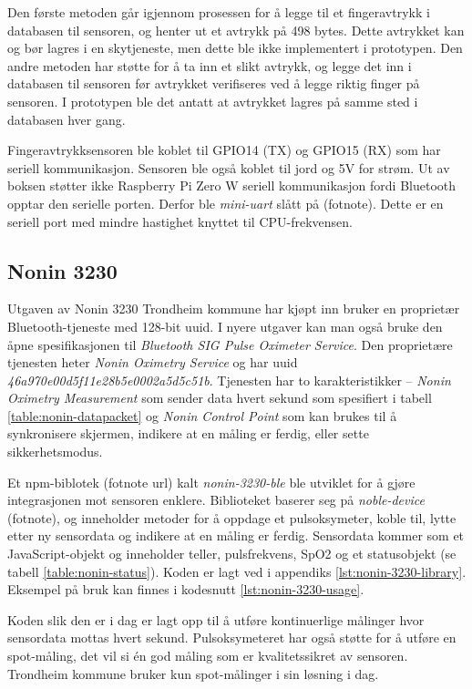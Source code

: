 Den første metoden går igjennom prosessen for å legge til et fingeravtrykk i databasen til sensoren, og henter ut et avtrykk
på 498 bytes. Dette avtrykket kan og bør lagres i en skytjeneste, men dette ble ikke implementert i prototypen.
Den andre metoden har støtte for å ta inn et slikt avtrykk, og legge det inn i databasen til sensoren før avtrykket
verifiseres ved å legge riktig finger på sensoren. I prototypen ble det antatt at avtrykket lagres på samme sted i databasen hver gang.

Fingeravtrykksensoren ble koblet til GPIO14 (TX) og GPIO15 (RX) som har seriell kommunikasjon. Sensoren ble også koblet til jord
og 5V for strøm. Ut av boksen støtter ikke Raspberry Pi Zero W seriell kommunikasjon fordi Bluetooth opptar den serielle porten.
Derfor ble \textit{mini-uart} slått på (fotnote). Dette er en seriell port med mindre hastighet knyttet til CPU-frekvensen.

\subsection{Nonin 3230}
Utgaven av Nonin 3230 Trondheim kommune har kjøpt inn bruker en proprietær Bluetooth-tjeneste med 128-bit \gls{uuid}.
I nyere utgaver kan man også bruke den åpne spesifikasjonen til \textit{Bluetooth SIG Pulse Oximeter Service}.
Den proprietære tjenesten heter \textit{Nonin Oximetry Service} og har \gls{uuid} \textit{46a970e00d5f11e28b5e0002a5d5c51b}.
Tjenesten har to karakteristikker -- \textit{Nonin Oximetry Measurement} som sender data hvert sekund som spesifiert
i tabell \ref{table:nonin-datapacket} og \textit{Nonin Control Point} som kan brukes til å synkronisere skjermen,
indikere at en måling er ferdig, eller sette sikkerhetsmodus. 

Et \gls{npm}-biblotek (fotnote url) kalt \textit{nonin-3230-ble} ble utviklet for å gjøre integrasjonen mot sensoren enklere.
Biblioteket baserer seg på \textit{noble-device} (fotnote), og inneholder metoder for å oppdage et pulsoksymeter,
koble til, lytte etter ny sensordata og indikere at en måling er ferdig. Sensordata kommer som et JavaScript-objekt
og inneholder teller, pulsfrekvens, SpO2 og et statusobjekt (se tabell \ref{table:nonin-status}).
Koden er lagt ved i appendiks \ref{lst:nonin-3230-library}.
Eksempel på bruk kan finnes i kodesnutt \ref{lst:nonin-3230-usage}.

Koden slik den er i dag er lagt opp til å utføre kontinuerlige målinger hvor sensordata mottas hvert sekund. Pulsoksymeteret
har også støtte for å utføre en spot-måling, det vil si én god måling som er kvalitetssikret av sensoren. Trondheim kommune
bruker kun spot-målinger i sin løsning i dag.

